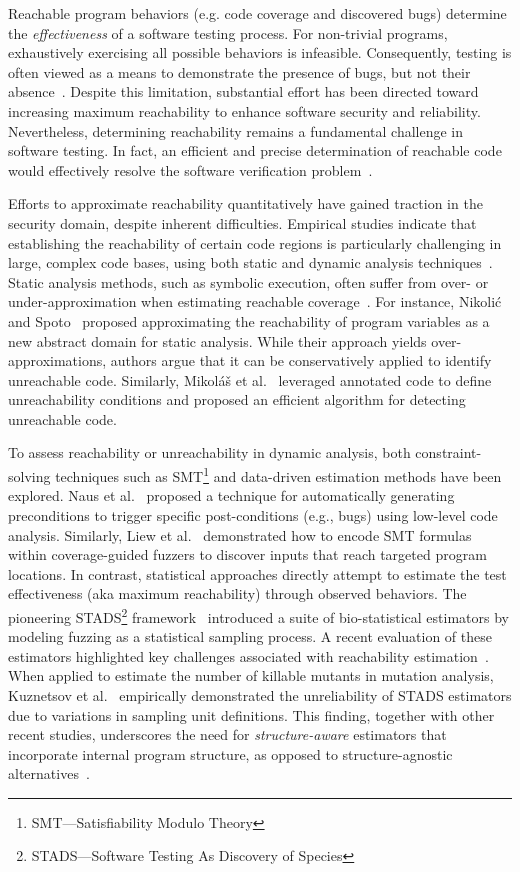 \documentclass[conference]{IEEEtran}
\begin{document}
Reachable program behaviors (e.g. code coverage and discovered bugs) determine the \emph{effectiveness} of a software testing process. For non-trivial programs, exhaustively exercising all possible behaviors is infeasible. Consequently, testing is often viewed as a means to demonstrate the presence of bugs, but not their absence~\cite{dijkstra2022reliability}. Despite this limitation, substantial effort has been directed toward increasing maximum reachability to enhance software security and reliability. Nevertheless, determining reachability remains a fundamental challenge in software testing. In fact, an efficient and precise determination of reachable code would effectively resolve the software verification problem~\cite{reachability_2023}. 

Efforts to approximate reachability quantitatively have gained traction in the security domain, despite inherent difficulties. Empirical studies indicate that establishing the reachability of certain code regions is particularly challenging in large, complex code bases, using both static and dynamic analysis techniques~\cite{reachability_questions}. Static analysis methods, such as symbolic execution, often suffer from over- or under-approximation when estimating reachable coverage~\cite{reachability_2023,Aniche2015}. For instance, Nikoli\'{c} and Spoto~\cite{reachability_program_vars} proposed approximating the reachability of program variables as a new abstract domain for static analysis. While their approach yields over-approximations, authors argue that it can be conservatively applied to identify unreachable code. Similarly, Mikol\'{a}\v{s} et al.~\cite{annotate_reachability} leveraged annotated code to define unreachability conditions and proposed an efficient algorithm for detecting unreachable code.

To assess reachability or unreachability in dynamic analysis, both constraint-solving techniques such as SMT\footnote{SMT—Satisfiability Modulo Theory} and data-driven estimation methods have been explored. Naus et al.~\cite{naus2023low} proposed a technique for automatically generating preconditions to trigger specific post-conditions (e.g., bugs) using low-level code analysis. Similarly, Liew et al.~\cite{Liew2019} demonstrated how to encode SMT formulas within coverage-guided fuzzers to discover inputs that reach targeted program locations. In contrast, statistical approaches directly attempt to estimate the test effectiveness (aka maximum reachability) through observed behaviors. The pioneering STADS\footnote{STADS—Software Testing As Discovery of Species} framework~\cite{stads} introduced a suite of bio-statistical estimators by modeling fuzzing as a statistical sampling process. A recent evaluation of these estimators highlighted key challenges associated with reachability estimation~\cite{reachability_2023}. When applied to estimate the number of killable mutants in mutation analysis, Kuznetsov et al.~\cite{killable} empirically demonstrated the unreliability of STADS estimators due to variations in sampling unit definitions. This finding, together with other recent studies, underscores the need for \emph{structure-aware} estimators that incorporate internal program structure, as opposed to structure-agnostic alternatives~\cite{statreachability_2023}.
\end{document}
